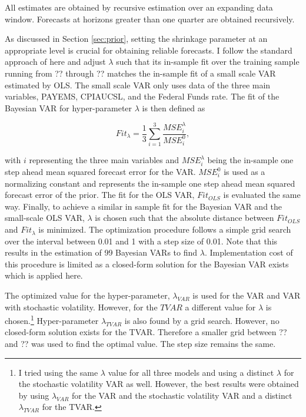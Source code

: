 \documentclass[12pt,letterpaper,fleqn]{article}           %
\begin{document}
All estimates are obtained by recursive estimation over an expanding data window. Forecasts at horizons greater than one quarter are obtained recursively.

As discussed in Section \ref{sec:prior}, setting the shrinkage parameter at an appropriate level is crucial for obtaining reliable forecasts. I follow the standard approach of \textcite{banbura10} here and adjust $\lambda$ such that its in-sample fit over the training sample running from ?? through ?? matches the in-sample fit of a small scale VAR estimated by OLS. The small scale VAR only uses data of the three main variables, PAYEMS, CPIAUCSL, and the Federal Funds rate. The fit of the Bayesian VAR for hyper-parameter $\lambda$ is then defined as

\begin{equation}
Fit_{\lambda} = \frac{1}{3}\sum_{i=1}^3 \frac{MSE_i^\lambda}{MSE_i^0},
\end{equation}

with $i$ representing the three main variables and $MSE_i^\lambda$ being the in-sample one step ahead mean squared forecast error for the VAR. $MSE_i^0$ is used as a normalizing constant and represents the in-sample one step ahead mean squared forecast error of the prior. The fit for the OLS VAR, $Fit_{OLS}$ is evaluated the same way. Finally, to achieve a similar in sample fit for the Bayesian VAR and the small-scale OLS VAR, $\lambda$ is chosen such that the absolute distance between $Fit_{OLS}$ and $Fit_{\lambda}$ is minimized. The optimization procedure follows a simple grid search over the interval between 0.01 and 1 with a step size of 0.01. Note that this results in the estimation of 99 Bayesian VARs to find $\lambda$. Implementation cost of this procedure is limited as a closed-form solution for the Bayesian VAR exists which is applied here.

The optimized value for the hyper-parameter, $\lambda_{VAR}$ is used for the VAR and VAR with stochastic volatility. However, for the $TVAR$ a different value for $\lambda$ is chosen.\footnote{I tried using the same $\lambda$ value for all three models and using a distinct $\lambda$ for the stochastic volatility VAR as well. However, the best results were obtained by using $\lambda_{VAR}$ for the VAR and the stochastic volatility VAR and a distinct $\lambda_{TVAR}$ for the TVAR.} Hyper-parameter $\lambda_{TVAR}$ is also found by a grid search. However, no closed-form solution exists for the TVAR. Therefore a smaller grid between ?? and ?? was used to find the optimal value. The step size remains the same.
\end{document}
